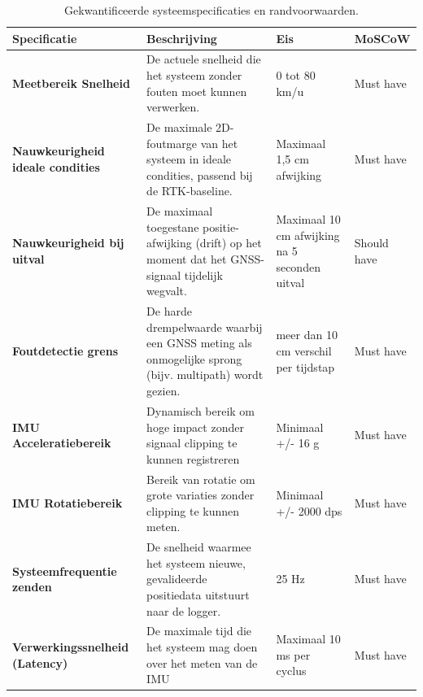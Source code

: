 \begin{table}[htbp]
    \centering
    \caption{Gekwantificeerde systeemspecificaties en randvoorwaarden.}
    \label{tab:specificaties}
    \renewcommand{\arraystretch}{1.5}
    \begin{tabular}{@{} p{3.5cm} p{6cm} p{4cm} p{1.5cm} @{}}
        \toprule
        \textbf{Specificatie} & \textbf{Beschrijving} & \textbf{Eis} & \textbf{MoSCoW} \\
        \midrule
        \textbf{Meetbereik Snelheid} & De actuele snelheid die het systeem zonder fouten moet kunnen verwerken. & 0 tot 80 km/u & Must have \\
        
        \textbf{Nauwkeurigheid ideale condities} & De maximale 2D-foutmarge van het systeem in ideale condities, passend bij de RTK-baseline. & Maximaal 1,5 cm afwijking & Must have \\
        
        \textbf{Nauwkeurigheid bij uitval} & De maximaal toegestane positie-afwijking (drift) op het moment dat het GNSS-signaal tijdelijk wegvalt. & Maximaal 10 cm afwijking na 5 seconden uitval & Should have \\
        
        \textbf{Foutdetectie grens} & De harde drempelwaarde waarbij een GNSS meting als onmogelijke sprong (bijv. multipath) wordt gezien. & meer dan 10 cm verschil per tijdstap & Must have \\
        
        \textbf{IMU Acceleratiebereik} & Dynamisch bereik om hoge impact zonder signaal clipping te kunnen registreren & Minimaal +/- 16 g & Must have \\
        
        \textbf{IMU Rotatiebereik} & Bereik van rotatie om grote variaties zonder clipping te kunnen meten. & Minimaal +/- 2000 dps & Must have \\
        
        \textbf{Systeemfrequentie zenden} & De snelheid waarmee het systeem nieuwe, gevalideerde positiedata uitstuurt naar de logger. & 25 Hz & Must have \\
        
        \textbf{Verwerkingssnelheid (Latency)} & De maximale tijd die het systeem mag doen over het meten van de IMU & Maximaal 10 ms per cyclus & Must have \\
        \bottomrule
    \end{tabular}
\end{table}

\newpage